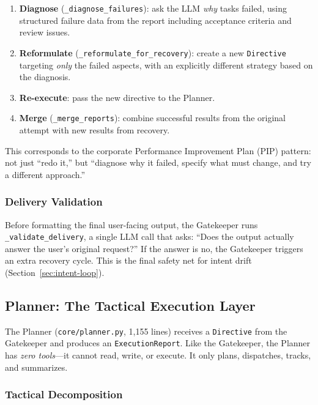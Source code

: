 \documentclass[11pt,a4paper]{article}
\begin{document}
\begin{enumerate}[leftmargin=*,itemsep=2pt]
    \item \textbf{Diagnose} (\texttt{\_diagnose\_failures}): ask the LLM
    \emph{why} tasks failed, using structured failure data from the report
    including acceptance criteria and review issues.
    \item \textbf{Reformulate} (\texttt{\_reformulate\_for\_recovery}): create
    a new \texttt{Directive} targeting \emph{only} the failed aspects, with an
    explicitly different strategy based on the diagnosis.
    \item \textbf{Re-execute}: pass the new directive to the Planner.
    \item \textbf{Merge} (\texttt{\_merge\_reports}): combine successful
    results from the original attempt with new results from recovery.
\end{enumerate}

This corresponds to the corporate Performance Improvement Plan (PIP) pattern:
not just ``redo it,'' but ``diagnose why it failed, specify what must change,
and try a different approach.''

\subsubsection*{Delivery Validation}

Before formatting the final user-facing output, the Gatekeeper runs
\texttt{\_validate\_delivery}, a single LLM call that asks: ``Does the output
actually answer the user's original request?'' If the answer is no, the
Gatekeeper triggers an extra recovery cycle. This is the final safety net
for intent drift (Section~\ref{sec:intent-loop}).

\subsection{Planner: The Tactical Execution Layer}

The Planner (\texttt{core/planner.py}, 1,155 lines) receives a
\texttt{Directive} from the Gatekeeper and produces an
\texttt{ExecutionReport}. Like the Gatekeeper, the Planner has \emph{zero
tools}---it cannot read, write, or execute. It only plans, dispatches, tracks,
and summarizes.

\subsubsection*{Tactical Decomposition}
\end{document}

